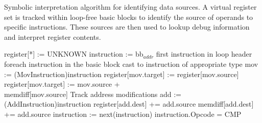 
\begin{algorithm}
  \caption{Symbolic interpretation algorithm for identifying data sources.  A
  virtual register set is tracked within loop-free basic blocks to identify
  the source of operands to specific instructions.  These sources are then
  used to lookup debug information and interpret register contents.}
  \label{alg:sinterp}
  \begin{algorithmic}[1]
    \State register[*] := UNKNOWN
    \State instruction := bb$_{addr}$ \Comment first instruction in loop header
    \Repeat \Comment foreach instruction in the basic block
      \State \Comment cast to instruction of appropriate type
        \State mov := (MovInstruction)instruction
          \State register[mov.target] := register[mov.source]
          \State register[mov.target] := mov.source + \\
                                         \hspace{6em}memdiff[mov.source]
        \EndIf
      \EndIf
      \State \Comment Track address modifications
        \State add := (AddInstruction)instruction
          \State register[add.dest] += add.source
        \EndIf
          \State memdiff[add.dest] += add.source
        \EndIf
      \EndIf
      \State instruction := next(instruction)
    \Until instruction.Opcode = CMP
  \end{algorithmic}
\end{algorithm}

